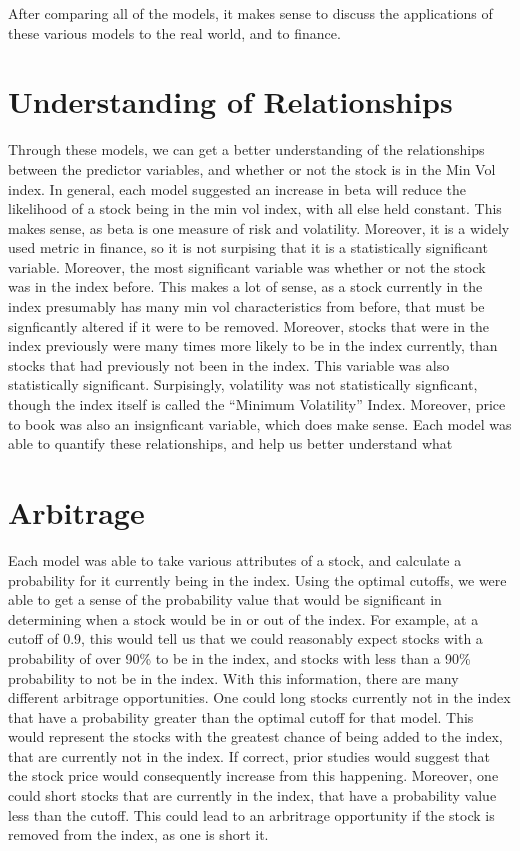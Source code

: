 \documentclass[12pt,twoside]{reedthesis}
\theoremstyle{definition}
\theoremstyle{definition}
\theoremstyle{definition}
\theoremstyle{remark}
\begin{document}
After comparing all of the models, it makes sense to discuss the
applications of these various models to the real world, and to finance.

\section{Understanding of
Relationships}\label{understanding-of-relationships}

Through these models, we can get a better understanding of the
relationships between the predictor variables, and whether or not the
stock is in the Min Vol index. In general, each model suggested an
increase in beta will reduce the likelihood of a stock being in the min
vol index, with all else held constant. This makes sense, as beta is one
measure of risk and volatility. Moreover, it is a widely used metric in
finance, so it is not surpising that it is a statistically significant
variable. Moreover, the most significant variable was whether or not the
stock was in the index before. This makes a lot of sense, as a stock
currently in the index presumably has many min vol characteristics from
before, that must be signficantly altered if it were to be removed.
Moreover, stocks that were in the index previously were many times more
likely to be in the index currently, than stocks that had previously not
been in the index. This variable was also statistically significant.
Surpisingly, volatility was not statistically signficant, though the
index itself is called the ``Minimum Volatility'' Index. Moreover, price
to book was also an insignficant variable, which does make sense. Each
model was able to quantify these relationships, and help us better
understand what

\section{Arbitrage}\label{arbitrage}

Each model was able to take various attributes of a stock, and calculate
a probability for it currently being in the index. Using the optimal
cutoffs, we were able to get a sense of the probability value that would
be significant in determining when a stock would be in or out of the
index. For example, at a cutoff of 0.9, this would tell us that we could
reasonably expect stocks with a probability of over 90\% to be in the
index, and stocks with less than a 90\% probability to not be in the
index. With this information, there are many different arbitrage
opportunities. One could long stocks currently not in the index that
have a probability greater than the optimal cutoff for that model. This
would represent the stocks with the greatest chance of being added to
the index, that are currently not in the index. If correct, prior
studies would suggest that the stock price would consequently increase
from this happening. Moreover, one could short stocks that are currently
in the index, that have a probability value less than the cutoff. This
could lead to an arbritrage opportunity if the stock is removed from the
index, as one is short it.
\end{document}
